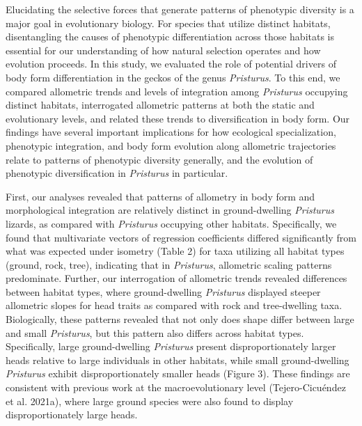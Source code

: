 \documentclass[
  11pt,
]{article}
\begin{document}
Elucidating the selective forces that generate patterns of phenotypic
diversity is a major goal in evolutionary biology. For species that
utilize distinct habitats, disentangling the causes of phenotypic
differentiation across those habitats is essential for our understanding
of how natural selection operates and how evolution proceeds. In this
study, we evaluated the role of potential drivers of body form
differentiation in the geckos of the genus \emph{Pristurus}. To this
end, we compared allometric trends and levels of integration among
\emph{Pristurus} occupying distinct habitats, interrogated allometric
patterns at both the static and evolutionary levels, and related these
trends to diversification in body form. Our findings have several
important implications for how ecological specialization, phenotypic
integration, and body form evolution along allometric trajectories
relate to patterns of phenotypic diversity generally, and the evolution
of phenotypic diversification in \emph{Pristurus} in particular.
\hfill\break

First, our analyses revealed that patterns of allometry in body form and
morphological integration are relatively distinct in ground-dwelling
\emph{Pristurus} lizards, as compared with \emph{Pristurus} occupying
other habitats. Specifically, we found that multivariate vectors of
regression coefficients differed significantly from what was expected
under isometry (Table 2) for taxa utilizing all habitat types (ground,
rock, tree), indicating that in \emph{Pristurus}, allometric scaling
patterns predominate. Further, our interrogation of allometric trends
revealed differences between habitat types, where ground-dwelling
\emph{Pristurus} displayed steeper allometric slopes for head traits as
compared with rock and tree-dwelling taxa. Biologically, these patterns
revealed that not only does shape differ between large and small
\emph{Pristurus}, but this pattern also differs across habitat types.
Specifically, large ground-dwelling \emph{Pristurus} present
disproportionately larger heads relative to large individuals in other
habitats, while small ground-dwelling \emph{Pristurus} exhibit
disproportionately smaller heads (Figure 3). These findings are
consistent with previous work at the macroevolutionary level
(Tejero-Cicuéndez et al. 2021a), where large ground species were also
found to display disproportionately large heads. \hfill\break
\end{document}
